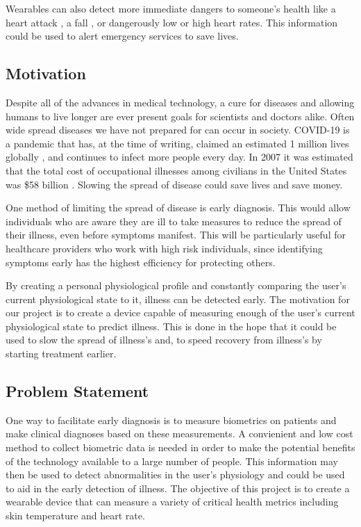 Wearables can also detect more immediate dangers to someone's health like a
heart attack \cite{heart-attack}, a fall \cite{Khojasteh_2018}, or dangerously
low or high heart rates.  This information could be used to alert emergency
services to save lives.

\subsection{Motivation}

Despite all of the advances in medical technology, a cure for diseases and
allowing humans to live longer are ever present goals for scientists and 
doctors alike.  Often wide spread diseases we have not prepared for can occur in
society.  COVID-19 is a pandemic that
has, at the time of writing, claimed an estimated 1 million lives globally
\cite{johns-hopkins-corona-chan}, and continues to infect more people every
day.  In 2007 it was estimated that the total cost of occupational illnesses
among civilians in the United States was \$58 billion \cite{Leigh2011}.
Slowing the spread of disease could save lives and save money.

One method of limiting the spread of disease is early diagnosis.  This would
allow individuals who are aware they are ill to take measures to reduce the
spread of their illness, even before symptoms manifest.  This will be
particularly useful for healthcare providers who work with high risk
individuals, since identifying symptoms early has the highest efficiency for
protecting others.

By creating a personal physiological profile and constantly
comparing the user's current physiological state to it, illness can be detected
early.  The motivation for our project is to create a device capable of measuring 
enough of the user's current physiological state to predict illness.  This is done 
in the hope that it could be used to slow the spread of illness's and, to speed
recovery from illness's by starting treatment earlier.

\subsection{Problem Statement}

One way to facilitate early diagnosis is to measure biometrics on patients and
make clinical diagnoses based on these measurements.
A convienient and low cost method to collect biometric data is needed in order
to make the potential benefits of the technology available to a large number of
people. This information may then be used to detect abnormalities in the user’s 
physiology and could be used to aid in the early detection of illness.
The objective of this project is to create a wearable device that can measure a
variety of critical health metrics including skin temperature and heart rate.

